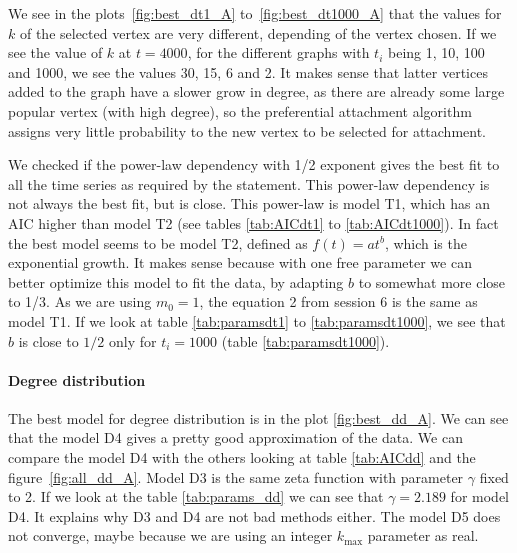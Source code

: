 \documentclass[a4paper]{article}
\begin{document}

We see in the plots~\ref{fig:best_dt1_A} to~\ref{fig:best_dt1000_A} that the 
values for $k$ of the selected vertex are very different, depending of the 
vertex chosen. If we see the value of $k$ at $t = 4000$, for the different 
graphs with $t_i$ being 1, 10, 100 and 1000, we see the values 30, 15, 6 and 2.  
It makes sense that latter vertices added to the graph have a slower grow in 
degree, as there are already some large popular vertex (with high degree), so 
the preferential attachment algorithm assigns very little probability to the new 
vertex to be selected for attachment.


We checked if the power-law dependency with 1/2 exponent gives the best fit to
all the time series as required by the statement. This power-law dependency is
not always the best fit, but is close. This power-law is model T1, which has an 
AIC higher than model T2 (see tables \ref{tab:AICdt1} to \ref{tab:AICdt1000}).  
In fact the best model seems to be model T2, defined as $f(t) = at^b$, which is 
the exponential growth. It makes sense because with one free parameter we can 
better optimize this model to fit the data, by adapting $b$ to somewhat more 
close to 1/3. As we are using $m_0 = 1$, the equation 2 from session 6 is the 
same as model T1.
%
If we look at table \ref{tab:paramsdt1} to \ref{tab:paramsdt1000}, we
see that $b$ is close to $1/2$ only for $t_i = 1000$ (table 
\ref{tab:paramsdt1000}).

\paragraph{Degree distribution}

The best model for degree distribution is in the plot \ref{fig:best_dd_A}. We 
can see that the model D4 gives a pretty good approximation of the data.
%
%
%
We can compare the model D4 with the others looking at table \ref{tab:AICdd} and 
the figure~\ref{fig:all_dd_A}. Model D3 is the same zeta function with parameter 
$\gamma$ fixed to 2. If we look at the table \ref{tab:params_dd} we can see that 
$\gamma = 2.189$ for model D4. It explains why D3 and D4 are not bad methods 
either. The model D5 does not converge, maybe because we are using an integer 
$k_{\max}$ parameter as real.
\end{document}
